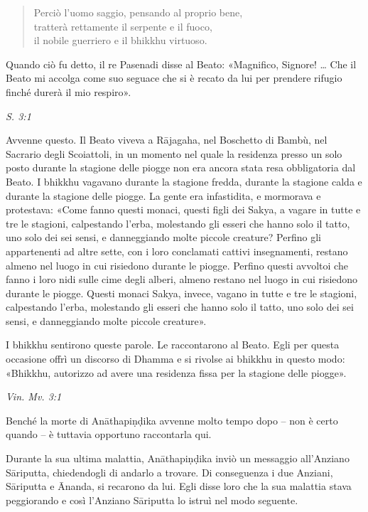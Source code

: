 \begin{quote}
Perciò l’uomo saggio, pensando al proprio bene, \\
tratterà rettamente il serpente e il fuoco, \\
il nobile guerriero e il bhikkhu virtuoso.
\end{quote}

Quando ciò fu detto, il re Pasenadi disse al Beato: «Magnifico, Signore!
…​ Che il Beato mi accolga come suo seguace che si è recato da lui per
prendere rifugio finché durerà il mio respiro».


\emph{S. 3:1}


 Avvenne questo. Il Beato viveva a Rājagaha, nel Boschetto
di Bambù, nel Sacrario degli Scoiattoli, in un momento nel quale la
residenza presso un solo posto durante la stagione delle piogge non era
ancora stata resa obbligatoria dal Beato. I bhikkhu vagavano durante la
stagione fredda, durante la stagione calda e durante la stagione delle
piogge. La gente era infastidita, e mormorava e protestava: «Come fanno
questi monaci, questi figli dei Sakya, a vagare in tutte e tre le
stagioni, calpestando l’erba, molestando gli esseri che hanno solo il
tatto, uno solo dei sei sensi, e danneggiando molte piccole creature?
Perfino gli appartenenti ad altre sette, con i loro conclamati cattivi
insegnamenti, restano almeno nel luogo in cui risiedono durante le
piogge. Perfino questi avvoltoi che fanno i loro nidi sulle cime degli
alberi, almeno restano nel luogo in cui risiedono durante le piogge.
Questi monaci Sakya, invece, vagano in tutte e tre le stagioni,
calpestando l’erba, molestando gli esseri che hanno solo il tatto, uno
solo dei sei sensi, e danneggiando molte piccole creature».


I bhikkhu sentirono queste parole. Le raccontarono al Beato. Egli per
questa occasione offrì un discorso di Dhamma e si rivolse ai bhikkhu in
questo modo: «Bhikkhu, autorizzo ad avere una residenza fissa per la
stagione delle piogge».


\emph{Vin. Mv. 3:1}


 Benché la morte di Anāthapiṇḍika avvenne molto tempo
dopo – non è certo quando – è tuttavia opportuno raccontarla qui.


 Durante la sua ultima malattia, Anāthapiṇḍika inviò
un messaggio all’Anziano Sāriputta, chiedendogli di andarlo a trovare.
Di conseguenza i due Anziani, Sāriputta e Ānanda, si recarono da lui.
Egli disse loro che la sua malattia stava peggiorando e così l’Anziano
Sāriputta lo istruì nel modo seguente.


